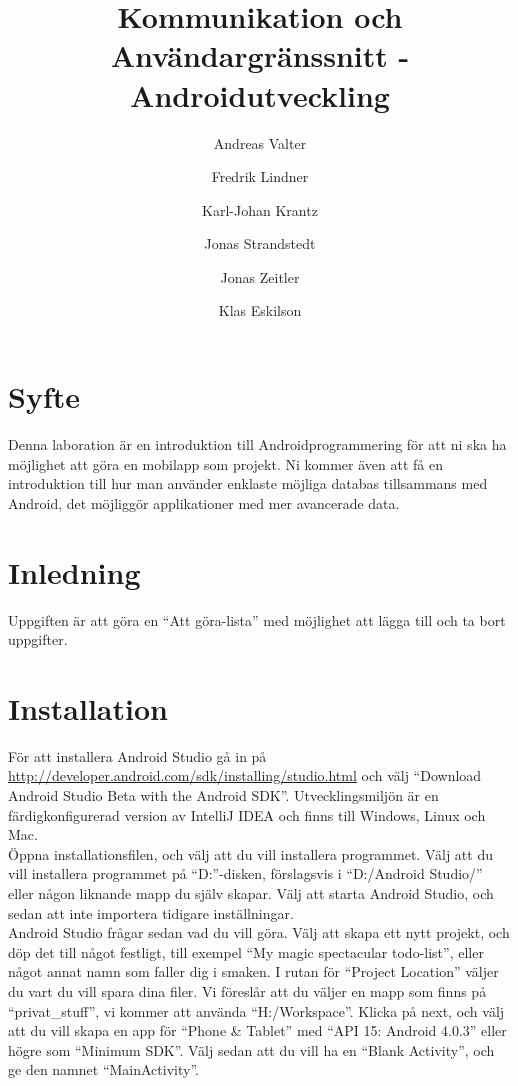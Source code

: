 \documentclass[11 pt, titlepage]{article} %
\begin{document}
\title{Kommunikation och Användargränssnitt - Androidutveckling}
\author{Andreas Valter \and Fredrik Lindner \and Karl-Johan Krantz \and Jonas Strandstedt \and Jonas Zeitler \and Klas Eskilson}
\maketitle

\section{Syfte}
Denna laboration är en introduktion till Androidprogrammering för att ni ska ha möjlighet att göra en mobilapp som projekt.
Ni kommer även att få en introduktion till hur man använder enklaste möjliga databas tillsammans med Android, det möjliggör applikationer med mer avancerade data.
\section{Inledning}
Uppgiften är att göra en “Att göra-lista” med möjlighet att lägga till och ta bort uppgifter.
\section{Installation}
För att installera Android Studio gå in på \href{http://developer.android.com/sdk/installing/studio.html}{http://developer.android.com/sdk/installing/studio.html} och välj “Download Android Studio Beta with the Android SDK”. Utvecklingsmiljön är en färdigkonfigurerad version av IntelliJ IDEA och finns till Windows, Linux och Mac.\\

Öppna installationsfilen, och välj att du vill installera programmet.
Välj att du vill installera programmet på ``D:''-disken, förslagsvis i ``D:/Android Studio/'' eller någon liknande mapp du själv skapar.
Välj att starta Android Studio, och sedan att inte importera tidigare inställningar.\\

Android Studio frågar sedan vad du vill göra.
Välj att skapa ett nytt projekt, och döp det till något festligt, till exempel ``My magic spectacular todo-list'', eller något annat namn som faller dig i smaken.
I rutan för ``Project Location'' väljer du vart du vill spara dina filer.
Vi föreslår att du väljer en mapp som finns på “privat\_stuff”, vi kommer att använda “H:/Workspace”.
Klicka på next, och välj att du vill skapa en app för ``Phone \& Tablet'' med ``API 15: Android 4.0.3'' eller högre som ``Minimum SDK''.
Välj sedan att du vill ha en ``Blank Activity'', och ge den namnet ``MainActivity''.\\
\end{document}
